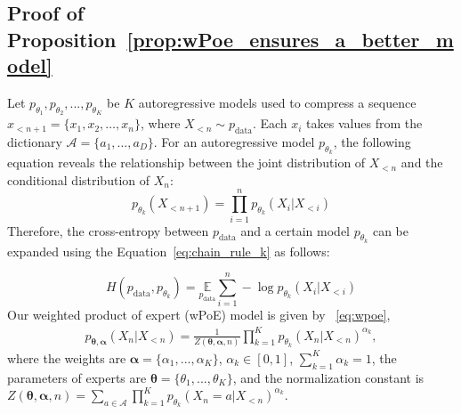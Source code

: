 \documentclass[11pt]{article}
\begin{document}
\subsection{Proof of Proposition~\ref{prop:wPoe_ensures_a_better_model}}
\label{sec:proof_of_proposition}
Let  $p_{\theta_1},p_{\theta_2},...,p_{\theta_K}$ be $K$ autoregressive models used to compress a sequence $x_{<n+1} = \{x_1, x_2, \dots, x_n\}$, where $X_{<n} \sim p_{\text{data}}$. Each $ x_i $ takes values from the dictionary $\mathcal{A} = \{ a_1, \dots, a_D \} $.  For an autoregressive model $p_{\theta_k}$, the following equation reveals the relationship between the joint distribution of \(X_{<n}\) and the conditional distribution of \(X_n\):
\begin{equation}
\label{eq:chain_rule_k}
    p_{\theta_k}(X_{<n+1}) = \displaystyle\prod_{i = 1}^{n} p_{\theta_k}(X_i | X_{<i})
\end{equation}
Therefore, the cross-entropy between $p_{\text{data}}$ and a certain model \(p_{\theta_k}\) can be expanded using the Equation~\ref{eq:chain_rule_k} as follows:

\begin{equation}
    H(p_{\text{data}},p_{\theta_k}) = \underset{p_{\text{data}}}{\mathbb{E}} \sum_{i = 1}^{n} -\log p_{\theta_k}(X_i | X_{<i})
\end{equation}
Our weighted product of expert (wPoE) model is given by ~\eqref{eq:wpoe},
\begin{equation*}
\begin{array}{cc}
    p_{\boldsymbol{\theta}, \boldsymbol{\alpha}}(X_n|  X_{<n}) =  \frac{1}{Z(\boldsymbol{\theta}, \boldsymbol{\alpha},n)}\displaystyle\prod_{k = 1}^K p_{\theta_k}(X_n  |  X_{<n})^{\alpha_k},
\end{array}
\end{equation*}
where the weights are $\boldsymbol{\alpha} = \{\alpha_1,...,\alpha_K\}$, $\alpha_k \in[0,1]$, $\sum_{k = 1}^K \alpha_k = 1$, the parameters of experts are $\boldsymbol{\theta} = \{\theta_1,...,\theta_K\}$, and the normalization constant is $Z(\boldsymbol{\theta}, \boldsymbol{\alpha}, n) = \sum_{a \in \mathcal{A}}\prod_{k = 1}^K p_{\theta_k}(X_n = a |  X_{<n})^{\alpha_k}$.
\end{document}
